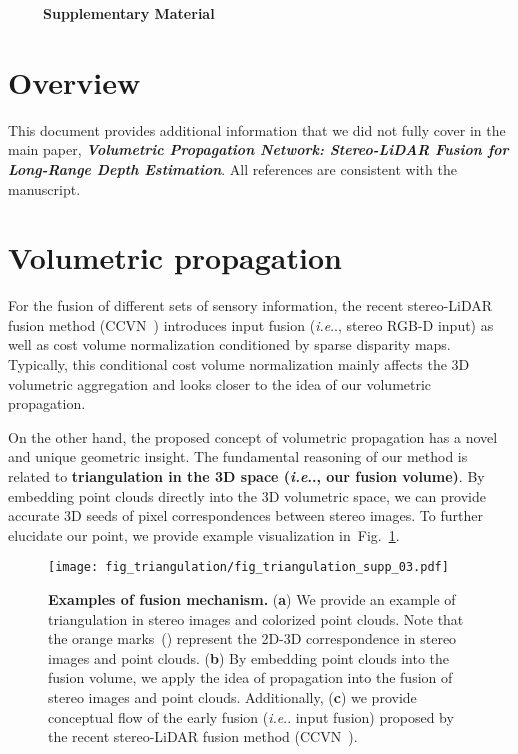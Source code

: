 \documentclass[letterpaper, 10 pt, conference]{ieeeconf}
\makeatletter
\DeclareRobustCommand\onedot{\futurelet\@let@token\@onedot}
\def\@onedot{\ifx\@let@token.\else.\null\fi\xspace}
\def\ie{\emph{i.e}\onedot} \def\Ie{{I.e}\onedot}
\newcommand{\Fref}[1]{Fig.~\textcolor{blue}{\ref{#1}}}
\makeatother
\begin{document}
\vspace{2mm}
{\LARGE \ \ \ \ \  \textbf{Supplementary Material}}
\vspace{2mm}

\setcounter{section}{0}
\setcounter{figure}{0}
\setcounter{table}{0}



\section{Overview}
This document provides additional information that we did not fully cover in the main paper, \textbf{\textit{Volumetric Propagation Network: Stereo-LiDAR Fusion for Long-Range Depth Estimation}}. All references are consistent with the manuscript. 

\section{Volumetric propagation}
\label{supp-sec:Propagation and triangulation}
For the fusion of different sets of sensory information, the recent stereo-LiDAR fusion method (CCVN~\cite{stereolidar_norm_costV_ccvn}) introduces input fusion (\ie, stereo RGB-D input) as well as cost volume normalization conditioned by sparse disparity maps. Typically, this conditional cost volume normalization mainly affects the 3D volumetric aggregation and looks closer to the idea of our volumetric propagation.

On the other hand, the proposed concept of volumetric propagation has a novel and unique geometric insight. The fundamental reasoning of our method is related to \textbf{triangulation in the 3D space (\ie, our fusion volume)}. By embedding point clouds directly into the 3D volumetric space, we can provide accurate 3D seeds of pixel correspondences between stereo images. 
To further elucidate our point, we provide example visualization in~\Fref{fig:triangulation}.
\begin{figure}[!t]
\centering
\texttt{[image: fig\_triangulation/fig\_triangulation\_supp\_03.pdf]}
\caption{\textbf{Examples of fusion mechanism.}
(\textbf{a}) We provide an example of triangulation in stereo images and colorized point clouds. Note that the orange marks~() represent the 2D-3D correspondence in stereo images and point clouds. 
(\textbf{b}) By embedding point clouds into the fusion volume, we apply the idea of propagation into the fusion of stereo images and point clouds. 
Additionally, (\textbf{c}) we provide conceptual flow of the early fusion (\ie input fusion) proposed by the recent stereo-LiDAR fusion method (CCVN~\cite{stereolidar_norm_costV_ccvn}). 
}
\vspace{-2mm}
\label{fig:triangulation}
\end{figure}
\end{document}
